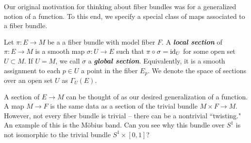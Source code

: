 \documentclass[abstract=on,twoside]{scrreprt}
\begin{document}
Our original motivation for thinking about fiber bundles was for a generalized notion of
a function. To this end, we specify a special class of maps associated to a fiber
bundle.
%
\begin{definition}
Let $\pi : E \to M$ be a a fiber bundle with model fiber $F$.
A \textbf{\textit{local section}} of $\pi : E \to M$ is a smooth map $\sigma : U \to E$
such that $\pi \circ \sigma = \operatorname{id}_U$ for some open set $U \subset M$. If $U = M$, we
call $\sigma $ a \textbf{\textit{global section}}. Equivalently, it is a smooth assignment
to each $p \in U$ a point in the fiber $E_p$. We denote the space of sections over
an open set $U$ as $\Gamma_U(E)$.
\end{definition}
%
A section of $E \to M$ can be thought of as our desired generalization of a function.
A map $M \to F$ is the same data as a section of the trivial bundle $M \times F \to M$.
However, not every fiber bundle is trivial -- there can be a nontrivial ``twisting."
An example of this is the M\"obius band. Can you see why this bundle over $S^1$ is not
isomorphic to the trivial bundle $S^1 \times [0,1]$? \\
\end{document}
